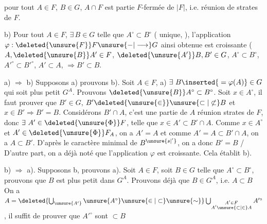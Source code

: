 pour tout $A\in F$, $B\in G$, $A\cap F$ est  partie $F$-fermée de $|F|$, i.e. réunion de strates de $F$.

b) Pour tout $A\in F$, $\exists\,B\in G$ telle que $A^\circ\subset B^\circ$ (  unique, ), l'application $\varphi:\deleted{\unsure{F}}F\unsure{-|\longrightarrow}G$ ainsi obtenue est croissante (
   $A,\deleted{\unsure{B}}A'\in F$, $\deleted{\unsure{A'}}B,B'\in G$,   $A^\circ\subset B^\circ$, $A'^\circ\subset B'^\circ$, $A'\subset A$, $\Longrightarrow B'\subset B$.

a) $\Longrightarrow$ b) Supposons a) prouvons b). Soit $A\in F$,  a) $\exists\ B\inserted{{}=\varphi(A)}\in G$  qui soit plus petit  $G^A$. Prouvons $\deleted{\unsure{B}}A^\circ\subset B^\circ$. Soit
$x\in A^\circ$, il faut prouver que $B'\in G$, $B'\deleted{\unsure{\in}}\unsure{\subset|\not\subset} B$ et $x\in B'\Longrightarrow B'=B$.  Considérons $B'\cap A$, c'est une partie de $A$ réunion  strates de $F$,
donc $\exists\ A'\in\deleted{\unsure{\Phi}}F$, telle que $x\in A'\subset B'\cap A$. Comme $x\in A^\circ$ et $A'\in\deleted{\unsure{\Phi}}F_A$, on a $A'=A$ et comme $A'=A\subset B'\cap A$, on a $A\subset B'$. D'après le caractère minimal de
$B^{\unsure{s|'}}$, on a donc $B'=B$  / D'autre part, on a déjà noté que l'application $\varphi$ est croissante. Cela établit b).

b) $\Longrightarrow$ a). Supposons b, prouvons a). Soit $A\in F$, soit $B\in G$ telle que $A^\circ\subset B^\circ$, prouvons que $B$ est plus petit  dans $G^A$.
Prouvons déjà que $B\in G^A$, i.e. $A\subset B$ 
 On a $A=\deleted{\bigcup_{\unsure{A'}}\unsure{A^\circ}\unsure{\in|\subset}\unsure{\sim}}\bigcup_{\substack{A'\in F\\ A'\unsure{\subset|\in} A}} A'^\circ$,  il suffit de prouver que  $A'^\circ$ sont $\subset B$
